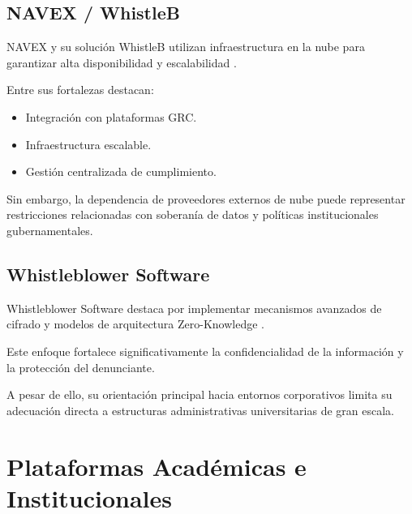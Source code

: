 \subsection{NAVEX / WhistleB}

\begin{flushleft}
\justifying

NAVEX y su solución WhistleB utilizan infraestructura en la nube para garantizar alta disponibilidad y escalabilidad \cite{17}.

Entre sus fortalezas destacan:

\begin{itemize}

    \item Integración con plataformas GRC.
    \item Infraestructura escalable.
    \item Gestión centralizada de cumplimiento.

\end{itemize}

Sin embargo, la dependencia de proveedores externos de nube puede representar restricciones relacionadas con soberanía de datos y políticas institucionales gubernamentales.

\end{flushleft}

\subsection{Whistleblower Software}

\begin{flushleft}
\justifying

Whistleblower Software destaca por implementar mecanismos avanzados de cifrado y modelos de arquitectura Zero-Knowledge \cite{18}.

Este enfoque fortalece significativamente la confidencialidad de la información y la protección del denunciante.

A pesar de ello, su orientación principal hacia entornos corporativos limita su adecuación directa a estructuras administrativas universitarias de gran escala.

\end{flushleft}


\section{Plataformas Académicas e Institucionales}

